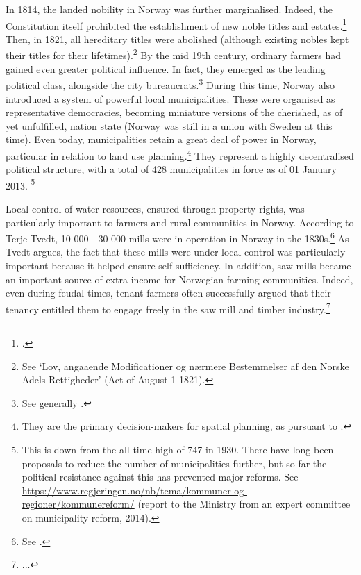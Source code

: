 In 1814, the landed nobility in Norway was further marginalised. Indeed, the Constitution itself prohibited the establishment of new noble titles and estates.\footcite[23|118]{c14} Then, in 1821, all hereditary titles were abolished (although existing nobles kept their titles for their lifetimes).\footnote{See `Lov, angaaende Modificationer og nærmere Bestemmelser af den Norske Adels Rettigheder' (Act of August 1 1821).} By the mid 19th century, ordinary farmers had gained even greater political influence. In fact, they emerged as the leading political class, alongside the city bureaucrats.\footnote{See generally \cite{hommerstad14}.} During this time, Norway also introduced a system of powerful local municipalities. These were organised as representative democracies, becoming miniature versions of the cherished, as of yet unfulfilled, nation state (Norway was still in a union with Sweden at this time). Even today, municipalities retain a great deal of power in Norway, particular in relation to land use planning.\footnote{They are the primary decision-makers for spatial planning, as pursuant to \cite{pb08}.} They represent a highly decentralised political structure, with a total of 428 municipalities in force as of 01 January 2013. \footnote{This is down from the all-time high of 747 in 1930. There have long been proposals to reduce the number of municipalities further, but so far the political resistance against this has prevented major reforms. See \url{https://www.regjeringen.no/nb/tema/kommuner-og-regioner/kommunereform/} (report to the Ministry from an expert committee on municipality reform, 2014).}

Local control of water resources, ensured through property rights, was particularly important to farmers and rural communities in Norway. According to Terje Tvedt, 10 000 - 30 000 mills were in operation in Norway in the 1830s.\footnote{See \cite[121]{tvedt13}.} As Tvedt argues, the fact that these mills were under local control was particularly important because it helped ensure self-sufficiency. In addition, saw mills became an important source of extra income for Norwegian farming communities.  Indeed, even during feudal times, tenant farmers often successfully argued that their tenancy entitled them to engage freely in the saw mill and timber industry.\footnote{...}

